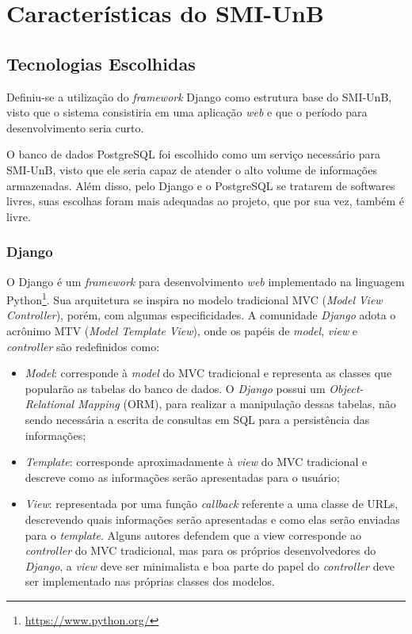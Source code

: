 \chapter{Características do SMI-UnB}

\section{Tecnologias Escolhidas}
Definiu-se a utilização do \textit{framework} Django \cite{django_project} como estrutura base do SMI-UnB, visto que o sistema consistiria em uma aplicação \textit{web} e que o período para desenvolvimento seria curto.

O banco de dados PostgreSQL foi escolhido como um serviço necessário para SMI-UnB, visto que ele seria capaz de atender o alto volume de informações armazenadas. Além disso, pelo Django e o PostgreSQL se tratarem de softwares livres, suas escolhas foram mais adequadas ao projeto, que por sua vez, também é livre.

    \subsection{Django}
    O Django é um \textit{framework} para desenvolvimento \textit{web} implementado na linguagem Python\footnote{\url{https://www.python.org/}}. Sua arquitetura se inspira no modelo tradicional MVC (\textit{Model} \textit{View} \textit{Controller}), porém, com algumas especificidades. A comunidade \textit{Django} adota o acrônimo MTV (\textit{Model} \textit{Template} \textit{View}), onde os papéis de \textit{model}, \textit{view} e \textit{controller} são redefinidos como:
    \begin{itemize}
        \item \textit{Model}: corresponde à \textit{model} do MVC tradicional e representa as classes que popularão as tabelas do banco de dados. O \textit{Django} possui um \textit{Object-Relational Mapping} (ORM), para realizar a manipulação dessas tabelas, não sendo necessária a escrita de consultas em SQL para a persistência das informações;
        \item \textit{Template}: corresponde aproximadamente à \textit{view} do MVC tradicional e descreve como as informações serão apresentadas para o usuário;
        \item \textit{View}: representada por uma função \textit{callback} referente a uma classe de URLs, descrevendo quais informações serão apresentadas e como elas serão enviadas para o \textit{template}. Alguns autores defendem que a view corresponde ao \textit{controller} do MVC tradicional, mas para os próprios desenvolvedores do \textit{Django}, a \textit{view} deve ser minimalista e boa parte do papel do \textit{controller} deve ser implementado nas próprias classes dos modelos.
    \end{itemize}

